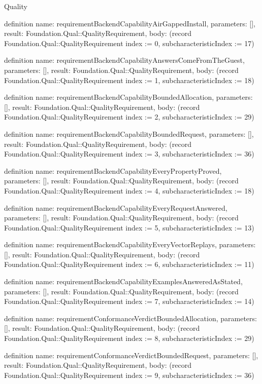 \begin{lexlean}{Quality}
\begin{semanticmodule}
definition{
  name: requirementBackendCapabilityAirGappedInstall,
  parameters: [],
  result: Foundation.Qual::QualityRequirement,
  body: (record Foundation.Qual::QualityRequirement {index := 0, subcharacteristicIndex := 17})
}

definition{
  name: requirementBackendCapabilityAnswersComeFromTheGuest,
  parameters: [],
  result: Foundation.Qual::QualityRequirement,
  body: (record Foundation.Qual::QualityRequirement {index := 1, subcharacteristicIndex := 18})
}

definition{
  name: requirementBackendCapabilityBoundedAllocation,
  parameters: [],
  result: Foundation.Qual::QualityRequirement,
  body: (record Foundation.Qual::QualityRequirement {index := 2, subcharacteristicIndex := 29})
}

definition{
  name: requirementBackendCapabilityBoundedRequest,
  parameters: [],
  result: Foundation.Qual::QualityRequirement,
  body: (record Foundation.Qual::QualityRequirement {index := 3, subcharacteristicIndex := 36})
}

definition{
  name: requirementBackendCapabilityEveryPropertyProved,
  parameters: [],
  result: Foundation.Qual::QualityRequirement,
  body: (record Foundation.Qual::QualityRequirement {index := 4, subcharacteristicIndex := 18})
}

definition{
  name: requirementBackendCapabilityEveryRequestAnswered,
  parameters: [],
  result: Foundation.Qual::QualityRequirement,
  body: (record Foundation.Qual::QualityRequirement {index := 5, subcharacteristicIndex := 13})
}

definition{
  name: requirementBackendCapabilityEveryVectorReplays,
  parameters: [],
  result: Foundation.Qual::QualityRequirement,
  body: (record Foundation.Qual::QualityRequirement {index := 6, subcharacteristicIndex := 11})
}

definition{
  name: requirementBackendCapabilityExamplesAnsweredAsStated,
  parameters: [],
  result: Foundation.Qual::QualityRequirement,
  body: (record Foundation.Qual::QualityRequirement {index := 7, subcharacteristicIndex := 14})
}

definition{
  name: requirementConformanceVerdictBoundedAllocation,
  parameters: [],
  result: Foundation.Qual::QualityRequirement,
  body: (record Foundation.Qual::QualityRequirement {index := 8, subcharacteristicIndex := 29})
}

definition{
  name: requirementConformanceVerdictBoundedRequest,
  parameters: [],
  result: Foundation.Qual::QualityRequirement,
  body: (record Foundation.Qual::QualityRequirement {index := 9, subcharacteristicIndex := 36})
}


\end{semanticmodule}
\end{lexlean}

